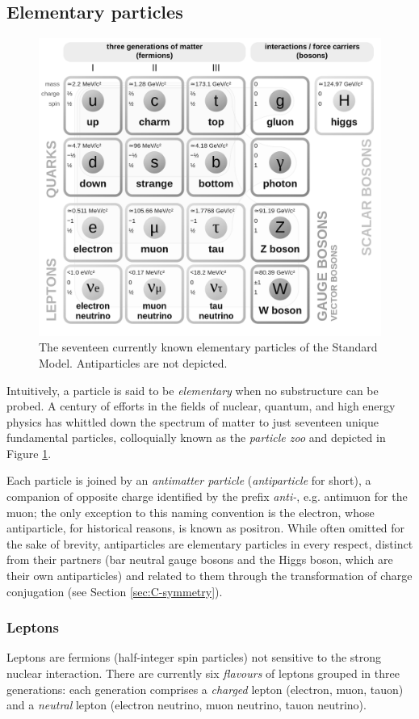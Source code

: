 \subsection{Elementary particles}
\begin{figure}[t!]
	\centering
	\includegraphics[width=.6\textwidth]{graphics/01-standard_model/Standard_Model_of_Elementary_Particles.png}
	\caption[Currently known Standard Model elementary particles.]{The seventeen currently known elementary particles of the Standard Model. Antiparticles are not depicted.}
	\label{fig:particle_zoo}
\end{figure}

Intuitively, a particle is said to be \textit{elementary} when no substructure can be probed. 
A century of efforts in the fields of nuclear, quantum, and high energy physics has whittled down the spectrum of matter to just seventeen unique fundamental particles, colloquially known as the \textit{particle zoo} and depicted in Figure \ref{fig:particle_zoo}.

Each particle is joined by an \textit{antimatter particle} (\textit{antiparticle} for short), a companion of opposite charge identified by the prefix \textit{anti-}, e.g. antimuon for the muon; the only exception to this naming convention is the electron, whose antiparticle, for historical reasons, is known as positron.
While often omitted for the sake of brevity, antiparticles are elementary particles in every respect, distinct from their partners (bar neutral gauge bosons and the Higgs boson, which are their own antiparticles) and related to them through the transformation of charge conjugation (see Section \ref{sec:C-symmetry}).

\subsubsection{Leptons}
Leptons are fermions (half-integer spin particles) not sensitive to the strong nuclear interaction.
There are currently six \textit{flavours} of leptons grouped in three generations: each generation comprises a \textit{charged} lepton (electron, muon, tauon) and a \textit{neutral} lepton (electron neutrino, muon neutrino, tauon neutrino).

